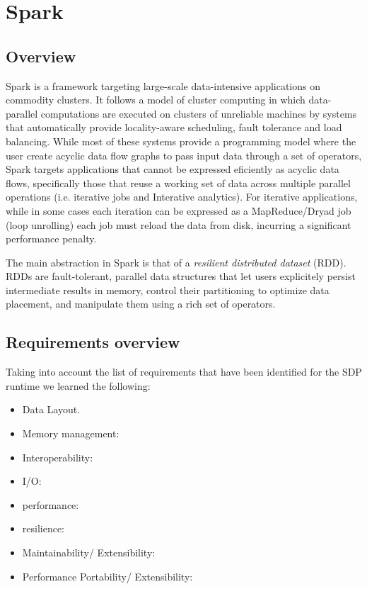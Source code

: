 \section{Spark}

\subsection{Overview}

Spark is a framework targeting large-scale data-intensive applications on commodity clusters. It follows a model of cluster computing in which data-parallel computations are 
executed on clusters of unreliable machines by systems that automatically provide locality-aware scheduling, fault tolerance and load balancing. 
While most of these systems provide a programming model where the user create acyclic data flow graphs to pass input data through a set of operators,
Spark targets applications that cannot be expressed eficiently as acyclic data flows, specifically those that reuse 
a working set of data across multiple parallel operations (i.e. iterative jobs and Interative analytics). For iterative applications, while in some cases each iteration can be 
expressed as a MapReduce/Dryad job (loop unrolling) each job must reload the data from disk, incurring a significant performance penalty.

The main abstraction in Spark is that of a \emph{resilient distributed dataset} (RDD). RDDs are fault-tolerant, parallel data structures that let users explicitely
persist intermediate results in memory, control their partitioning to optimize data placement, and manipulate them using a rich set of operators.



\subsection{Requirements overview}

Taking into account the list of requirements that have been identified for the SDP runtime we learned the following: 
\begin{itemize}
\item Data Layout. 
\item Memory management: 
\item Interoperability: 
\item I/O: 
\item performance: 
\item resilience: 
\item Maintainability/ Extensibility: 
\item Performance Portability/ Extensibility: 
\end{itemize}

